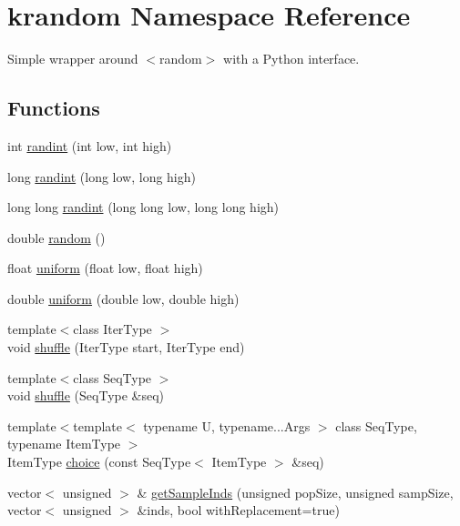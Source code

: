 \hypertarget{namespacekrandom}{\section{krandom Namespace Reference}
\label{namespacekrandom}
}


Simple wrapper around {\ttfamily $<$random$>$} with a Python interface.  


\subsection*{Functions}
\begin{DoxyCompactItemize}
\item 
int \hyperlink{namespacekrandom_a32b7337c1131ea0fbbd6b5f20aac2002}{randint} (int low, int high)
\item 
long \hyperlink{namespacekrandom_adc8e2bfa37c40fdecc8f601a266ab447}{randint} (long low, long high)
\item 
long long \hyperlink{namespacekrandom_a4672262133b6b130d7ca8b49f55595a2}{randint} (long long low, long long high)
\item 
double \hyperlink{namespacekrandom_a6a320147afafc7e81429b1a1ab4ec2e0}{random} ()
\item 
float \hyperlink{namespacekrandom_aa5f77704c3bf39731c986b7d27caf0fe}{uniform} (float low, float high)
\item 
double \hyperlink{namespacekrandom_ae89a756b3d067650aa9712efe6e930e2}{uniform} (double low, double high)
\item 
{\footnotesize template$<$class Iter\-Type $>$ }\\void \hyperlink{namespacekrandom_abac374525fd029faa58cb9c43cab41eb}{shuffle} (Iter\-Type start, Iter\-Type end)
\item 
{\footnotesize template$<$class Seq\-Type $>$ }\\void \hyperlink{namespacekrandom_a3cf920703fa6e180b1aa4d4c86799626}{shuffle} (Seq\-Type \&seq)
\item 
{\footnotesize template$<$template$<$ typename U, typename...\-Args $>$ class Seq\-Type, typename Item\-Type $>$ }\\Item\-Type \hyperlink{namespacekrandom_a59c038687d5825d1b6b8f26cf91dee20}{choice} (const Seq\-Type$<$ Item\-Type $>$ \&seq)
\item 
vector$<$ unsigned $>$ \& \hyperlink{namespacekrandom_a50015c42a5cb2ab60017b00abbb4ffde}{get\-Sample\-Inds} (unsigned pop\-Size, unsigned samp\-Size, vector$<$ unsigned $>$ \&inds, bool with\-Replacement=true)

\end{DoxyCompactItemize}
